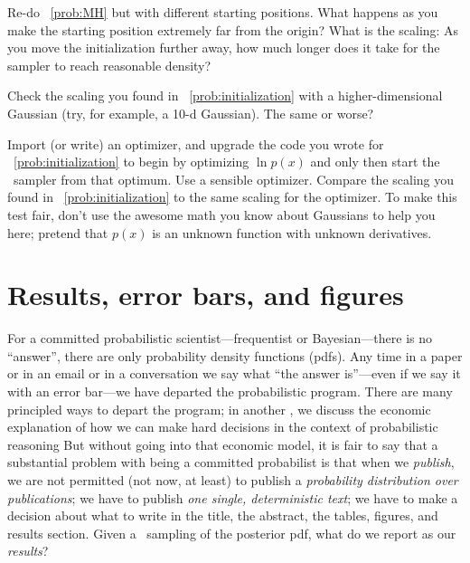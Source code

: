 \documentclass[modern]{aastex61}
\newcommand{\MCMC}{\acronym{MCMC}}
\begin{document}
\begin{problem}\label{prob:initialization}
Re-do \problemname~\ref{prob:MH} but with different starting
positions.
What happens as you make the starting position extremely far from the
origin?
What is the scaling:  As you move the initialization further away,
how much longer does it take for the sampler to reach reasonable
density?
\end{problem}

\begin{problem}
Check the scaling you found in \problemname~\ref{prob:initialization}
with a higher-dimensional Gaussian (try, for example, a 10-d Gaussian).
The same or worse?
\end{problem}

\begin{problem}\label{prob:optimization}
Import (or write) an optimizer, and upgrade the code you wrote for
\problemname~\ref{prob:initialization} to begin by optimizing $\ln
p(x)$ and only then start the \MCMC\ sampler from that optimum.
Use a sensible optimizer.
Compare the scaling you found in
\problemname~\ref{prob:initialization} to the same scaling for the
optimizer.
To make this test fair, don't use the awesome math you know about
Gaussians to help you here; pretend that $p(x)$ is an unknown function
with unknown derivatives.
\end{problem}

\section{Results, error bars, and figures}\label{sec:results}

For a committed probabilistic scientist---frequentist or
Bayesian---there is no ``answer'', there are only probability density
functions (pdfs).  Any time in a paper or in an email or in a conversation
we say what ``the answer is''---even if we say it with an error
bar---we have departed the probabilistic program.  There are many
principled ways to depart the program; in another \documentname, we
discuss the economic explanation of how we can make hard decisions in
the context of probabilistic reasoning
But without going into that economic model, it is fair to say that a
substantial problem with being a committed probabilist is that when we
\emph{publish}, we are not permitted (not now, at least) to publish a
\emph{probability distribution over publications}; we have to publish
\emph{one single, deterministic text}; we have to make a decision about what
to write in the title, the abstract, the tables, figures, and results
section.  Given a \MCMC\ sampling of the posterior pdf, what do we
report as our \emph{results}?
\end{document}
